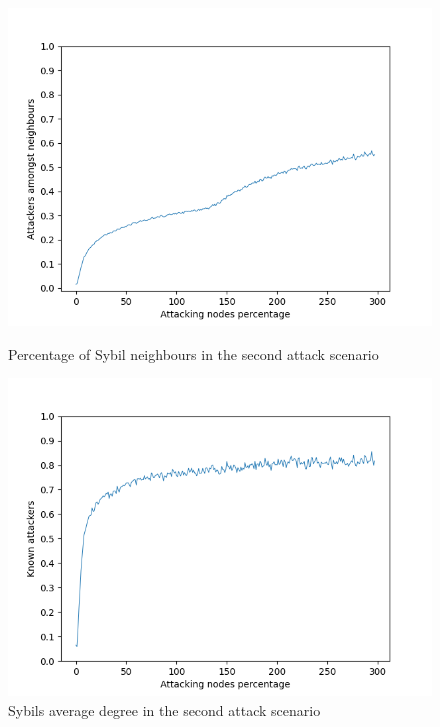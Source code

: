     \begin{figure}[ht]
        \begin{minipage}[b]{0.5\linewidth}
            \includegraphics[width=1.1\textwidth]{pict/results/ext-hon-atk-neigh.png}
			\centering
			\caption{Percentage of Sybil neighbours in the second attack scenario}
			\label{fig:ex-atk-neigh}
        \end{minipage}
        \hspace{0.5cm}
        \begin{minipage}[b]{0.5\linewidth}
			\centering
            \includegraphics[width=1.1\textwidth]{pict/results/ex-hon-atk-known.png}
			\caption{Sybils average degree in the second attack scenario}
			\label{fig:ex-atk-known}
        \end{minipage}
    \end{figure}
    
